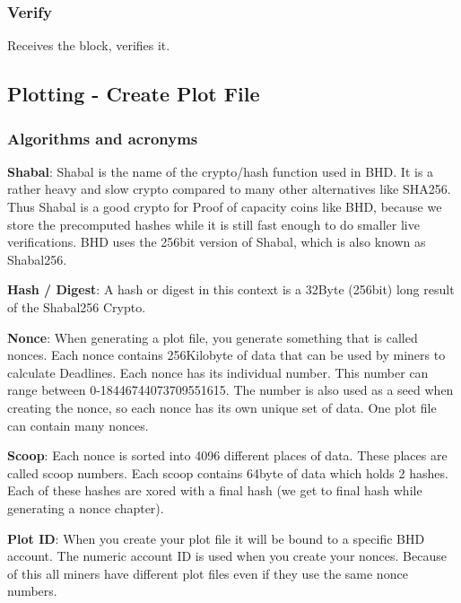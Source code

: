 \subsubsection{Verify}
\begin{flushleft}
    Receives the block, verifies it.
\end{flushleft}
\subsection{Plotting - Create Plot File}
\subsubsection{Algorithms and acronyms}
\begin{flushleft}
    \textbf{Shabal}: Shabal is the name of the crypto/hash function used in BHD. It is a rather heavy and slow crypto compared to many other alternatives like SHA256. Thus Shabal is a good crypto for Proof of capacity coins like BHD, because we store the precomputed hashes while it is still fast enough to do smaller live verifications. BHD uses the 256bit version of Shabal, which is also known as Shabal256.
\end{flushleft}
\begin{flushleft}
    \textbf{Hash / Digest}: A hash or digest in this context is a 32Byte (256bit) long result of the Shabal256 Crypto.
\end{flushleft}
\begin{flushleft}
    \textbf{Nonce}: When generating a plot file, you generate something that is called nonces. Each nonce contains 256Kilobyte of data that can be used by miners to calculate Deadlines. Each nonce has its individual number. This number can range between 0-18446744073709551615. The number is also used as a seed when creating the nonce, so each nonce has its own unique set of data. One plot file can contain many nonces.
\end{flushleft}
\begin{flushleft}
    \textbf{Scoop}: Each nonce is sorted into 4096 different places of data. These places are called scoop numbers. Each scoop contains 64byte of data which holds 2 hashes. Each of these hashes are xored with a final hash (we get to final hash while generating a nonce chapter).
\end{flushleft}
\begin{flushleft}
    \textbf{Plot ID}: When you create your plot file it will be bound to a specific BHD account. The numeric account ID is used when you create your nonces. Because of this all miners have different plot files even if they use the same nonce numbers.
\end{flushleft}
